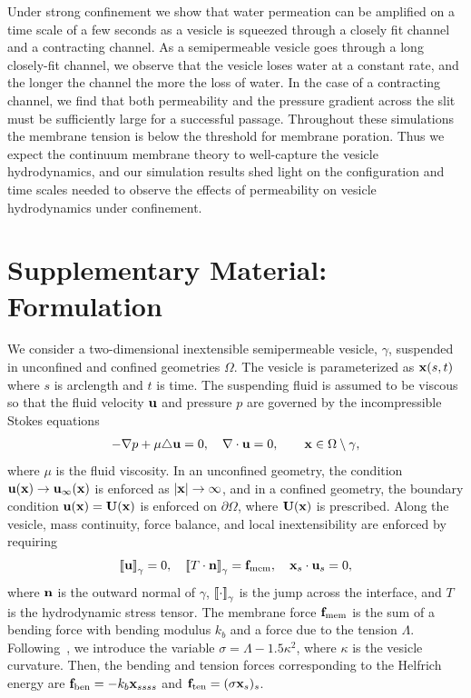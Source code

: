 \documentclass[9pt,twocolumn,twoside,lineno]{pnas-new}
\begin{document}
Under strong confinement we show that water permeation can be amplified
on a time scale of a few seconds as a vesicle is squeezed through a
closely fit channel and a contracting channel. As a semipermeable
vesicle goes through a long closely-fit channel, we observe that the
vesicle loses water at a constant rate, and the longer the channel the
more the loss of water. In the case of a contracting channel, we find
that both permeability and the pressure gradient across the slit must be
sufficiently large for a successful passage. Throughout these
simulations the membrane tension is below the threshold for membrane
poration. Thus we expect the continuum membrane theory to well-capture
the vesicle hydrodynamics, and our simulation results shed light on the
configuration and time scales needed to observe the effects of
permeability on vesicle hydrodynamics under confinement. 

% 
 


\section*{Supplementary Material: Formulation}
We consider a two-dimensional inextensible semipermeable vesicle,
$\gamma$, suspended in unconfined and confined geometries $\Omega$. The
vesicle is parameterized as $\mathbf{x}(s,t)$ where $s$ is arclength and $t$ is
time. The suspending fluid is assumed to be viscous so that the fluid
velocity $\mathbf{u}$ and pressure $p$ are governed by the incompressible
Stokes equations
\begin{align}
  \label{eqn:governing}
  -\nabla p + \mu \triangle \mathbf{u} = 0, \quad
  \nabla \cdot \mathbf{u} = 0, \qquad \mathbf{x} \in \Omega \setminus \gamma,
\end{align}
where $\mu$ is the fluid viscosity. In an unconfined geometry, the
condition $\mathbf{u}(\mathbf{x}) \rightarrow \mathbf{u}_\infty(\mathbf{x})$ is enforced as $|\mathbf{x}|
\rightarrow \infty$, and in a confined geometry, the boundary condition
$\mathbf{u}(\mathbf{x}) = \mathbf{U}(\mathbf{x})$ is enforced on $\partial \Omega$, where $\mathbf{U}(\mathbf{x})$
is prescribed. Along the vesicle, mass continuity, force balance, and
local inextensibility are enforced by requiring
\begin{align}
  \label{eqn:jump}
  \left[\!\left[ \mathbf{u} \right]\!\right]_\gamma = 0, \quad
  \left[\!\left[ T\cdot\mathbf{n} \right]\!\right]_\gamma = \mathbf{f}_\mathrm{mem}, \quad
  \mathbf{x}_s \cdot \mathbf{u}_s = 0,
\end{align}
where $\mathbf{n}$ is the outward normal of $\gamma$, $\left[\!\left[ \cdot \right]\!\right]_\gamma$ is the
jump across the interface, and $T$ is the hydrodynamic stress tensor.
The membrane force $\mathbf{f}_\mathrm{mem}$ is the sum of a bending force
with bending modulus $k_b$ and a force due to the tension $\Lambda$.
Following~\cite{vee-gue-zor-bir2009}, we introduce the variable $\sigma
= \Lambda - 1.5\kappa^2$, where $\kappa$ is the vesicle curvature. Then,
the bending and tension forces corresponding to the Helfrich energy are
$\mathbf{f}_\mathrm{ben} = -k_b \mathbf{x}_{ssss}$ and $\mathbf{f}_\mathrm{ten} = (\sigma
\mathbf{x}_s)_s$. 
\end{document}
